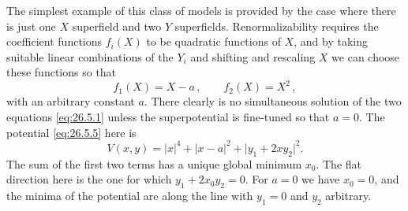 The simplest example of this class of models is provided by the case where
there is just one $X$ superfield and two $Y$ superfields. Renormalizability
requires the coefficient functions $f_i(X)$ to be quadratic functions of
$X$, and by taking suitable linear combinations of the $Y_i$ and shifting and
rescaling $X$ we can choose these functions so that
\begin{equation}
  f_1(X)=X-a\,,
  \qquad
  f_2(X)=X^2\,,
  \tag{26.5.6}\label{eq:26.5.6}
\end{equation}
with an arbitrary constant $a$. There clearly is no simultaneous solution of
the two equations \eqref{eq:26.5.1} unless the superpotential is fine-tuned so
that $a=0$. The potential \eqref{eq:26.5.5} here is
\begin{equation}
  V(x,y)=\lvert x\rvert^4+\lvert x-a\rvert^2
          +\lvert y_1+2xy_2\rvert^2 .
  \tag{26.5.7}\label{eq:26.5.7}
\end{equation}
The sum of the first two terms has a unique global minimum $x_0$. The flat
direction here is the one for which $y_1+2x_0y_2=0$. For $a=0$ we have
$x_0=0$, and the minima of the potential are along the line with $y_1=0$ and
$y_2$ arbitrary.


